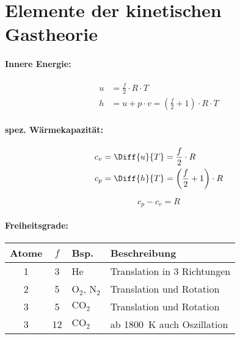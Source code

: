 
\section{Elemente der kinetischen Gastheorie} %
	\paragraph{Innere Energie:}
		\begin{align*}
			u &= \frac{f}{2} \cdot R \cdot T \\
			h &= u+p\cdot v=\left(\frac{f}{2}+1\right)\cdot R \cdot T
		\end{align*}
		
	\paragraph{spez. Wärmekapazität:}
		\begin{align*}
			c_v &= \Diff{u}{T} = \frac{f}{2} \cdot R \\
			c_p &= \Diff{h}{T} = \left(\frac{f}{2} +1\right) \cdot R
		\end{align*}
	
		\[
			c_p - c_v = R
		\]
		
	\paragraph{Freiheitsgrade:}
		\begin{center}
			\begin{tabular}{ccll}
				\toprule
				Atome & $f$ & Bsp. & Beschreibung \\
				\midrule
				1 & 3 & He & Translation in 3 Richtungen \\
				2 & 5 & $\text{O}_2$, $\text{N}_2$ & Translation und Rotation \\
				3 & 5 & $\text{CO}_2$ & Translation und Rotation \\
				3 & 12 & $\text{CO}_2$ & ab \SI{1800}{\kelvin} auch Oszillation \\
				\bottomrule
			\end{tabular}
		\end{center}
	
